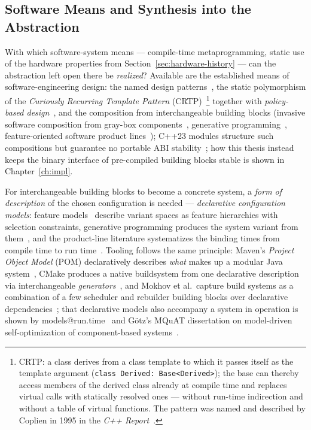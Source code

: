 \begin{nurkurz}
\section{Software Means and Synthesis into the Abstraction}\label{sec:software-means}
With which software-system means --- compile-time metaprogramming, static use of the hardware
properties from Section~\ref{sec:hardware-history} --- can the abstraction left open there be
\emph{realized}? Available are the
established means of software-engineering design: the named design
patterns~\cite{gamma1994patterns}, the static polymorphism of the \emph{Curiously Recurring Template
Pattern} (CRTP)~\cite{coplien1995crtp,vandevoorde2017templates}\footnote{CRTP\@: a class derives from a
class template to which it passes itself as the template argument (\texttt{class Derived: Base<Derived>});
the base can thereby access members of the derived class already at compile time and replaces virtual
calls with statically resolved ones --- without run-time indirection and without a table of virtual
functions. The pattern was named and described by Coplien in 1995 in the
\emph{C++ Report}~\cite{coplien1995crtp}.} together with \emph{policy-based
design}~\cite{alexandrescu2001modern}, and the composition from interchangeable building blocks (invasive
software composition from gray-box components~\cite{assmann2003invasive}, generative
programming~\cite{czarnecki2000generative}, feature-oriented software product
lines~\cite{apel2013feature,batory1992hierarchical}); C++23 modules structure such compositions but guarantee
no portable ABI stability~\cite{wg21_modules_abi}; how this thesis instead keeps the binary interface of
pre-compiled building blocks stable is shown in Chapter~\ref{ch:impl}.

For interchangeable building blocks to become a concrete system, a \emph{form of description} of the chosen
configuration is needed --- \emph{declarative configuration models}: feature models~\cite{kang1990foda}
describe variant spaces as feature hierarchies with selection constraints, generative programming produces
the system variant from them~\cite{czarnecki2000generative}, and the product-line literature systematizes the
binding times from compile time to run time~\cite{apel2013feature}. Tooling follows the same principle:
Maven's \emph{Project Object Model} (POM) declaratively describes \emph{what} makes up a modular Java
system~\cite{maven_pom}, CMake produces a native buildsystem from one declarative description via
interchangeable \emph{generators}~\cite{cmake_manual}, and Mokhov et al.\ capture build systems as a
combination of a few scheduler and rebuilder building blocks over declarative
dependencies~\cite{mokhov2018build}; that declarative models also accompany a system in operation is shown by
models@run.time~\cite{blair2009modelsruntime} and G\"{o}tz's MQuAT dissertation on model-driven
self-optimization of component-based systems~\cite{goetz2013mqat}.


\end{nurkurz}
